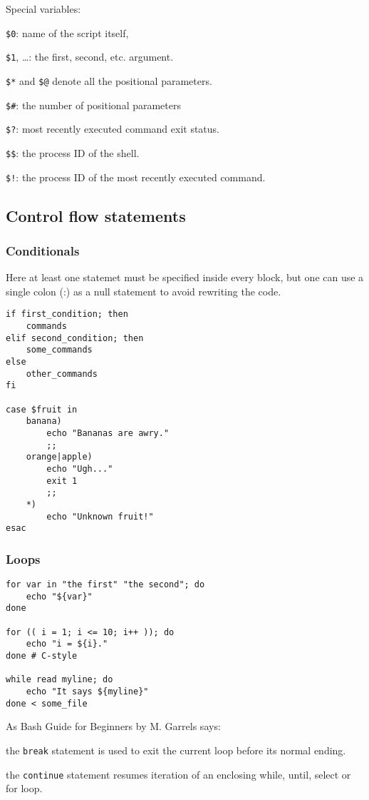 Special variables:
\begin{enumx}
	\item \texttt{\$0}: name of the script itself,
	\item \texttt{\$1}, \ldots: the first, second, etc. argument.
	\item \texttt{\$*} and \texttt{\$@} denote all the positional parameters.
	\item \texttt{\$\#}: the number of positional parameters
	\item \texttt{\$?}: most recently executed command exit status.
	\item \texttt{\$\$}: the process ID of the shell.
	\item \texttt{\$!}: the process ID of the most recently executed command.
\end{enumx}

\subsection{Control flow statements}
\subsubsection{Conditionals}
Here at least one statemet must be specified inside every block,
but one can use a single colon (:) as a null statement to avoid
rewriting the code.

\begin{verbatim}
if first_condition; then
    commands
elif second_condition; then
    some_commands
else
    other_commands	
fi

case $fruit in
    banana)
        echo "Bananas are awry."
        ;;
    orange|apple)
        echo "Ugh..."
        exit 1
        ;;
    *)
        echo "Unknown fruit!"
esac
\end{verbatim}

\subsubsection{Loops}
\begin{verbatim}
for var in "the first" "the second"; do
    echo "${var}"
done

for (( i = 1; i <= 10; i++ )); do
    echo "i = ${i}."
done # C-style

while read myline; do
    echo "It says ${myline}"
done < some_file
\end{verbatim}

As Bash Guide for Beginners by M. Garrels says:
\begin{enumx}
\item the \texttt{break} statement is used to 
exit the current loop before its normal ending. 
\item the \texttt{continue} statement resumes iteration 
of an enclosing while, until, select or for loop.
\end{enumx}


